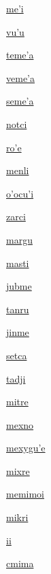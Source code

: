 {\hyperlink{val:mehi}{me'i}}{}{}{}

{\hyperlink{val:vuhu}{vu'u}}{}{}{}

{\hyperlink{val:temeha}{teme'a}}{}{}{}

{\hyperlink{val:vemeha}{veme'a}}{}{}{}

{\hyperlink{val:semeha}{seme'a}}{}{}{}

{\hyperlink{val:notci}{notci}}{}{}{}

{\hyperlink{val:rohe}{ro'e}}{}{}{}

{\hyperlink{val:menli}{menli}}{}{}{}

{\hyperlink{val:ohocuhi}{o'ocu'i}}{}{}{}

{\hyperlink{val:zarci}{zarci}}{}{}{}

{\hyperlink{val:margu}{margu}}{}{}{}

{\hyperlink{val:masti}{masti}}{}{}{}

{\hyperlink{val:jubme}{jubme}}{}{}{}

{\hyperlink{val:tanru}{tanru}}{}{}{}

{\hyperlink{val:jinme}{jinme}}{}{}{}

{\hyperlink{val:setca}{setca}}{}{}{}

{\hyperlink{val:tadji}{tadji}}{}{}{}

{\hyperlink{val:mitre}{mitre}}{}{}{}

{\hyperlink{val:mexno}{mexno}}{}{}{}

{\hyperlink{val:mexyguhe}{mexygu'e}}{}{}{}

{\hyperlink{val:mixre}{mixre}}{}{}{}

{\hyperlink{val:memimoi}{memimoi}}{}{}{}

{\hyperlink{val:mikri}{mikri}}{}{}{}

{\hyperlink{val:ii}{ii}}{}{}{}

{\hyperlink{val:cmima}{cmima}}{}{}{}

